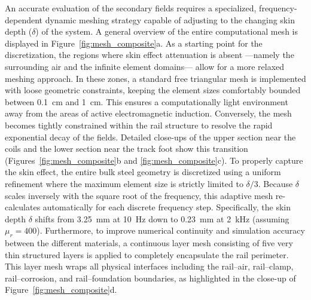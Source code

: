 An accurate evaluation of the secondary fields requires a specialized,
frequency-dependent dynamic meshing strategy capable of adjusting to the
changing skin depth ($\delta$) of the system. A general overview of the
entire computational mesh is displayed in Figure~\ref{fig:mesh_composite}a.
As a starting point for the discretization, the regions where skin effect
attenuation is absent ---namely the surrounding air and the infinite element
domains--- allow for a more relaxed meshing approach. In these zones, a
standard free triangular mesh is implemented with loose geometric
constraints, keeping the element sizes comfortably bounded between
\SI{0.1}{\centi\meter} and \SI{1}{\centi\meter}. This ensures a
computationally light environment away from the areas of active
electromagnetic induction. Conversely, the mesh becomes tightly constrained
within the rail structure to resolve the rapid exponential decay of the
fields. Detailed close-ups of the upper section near the coils and the lower
section near the track foot show this transition
(Figures~\ref{fig:mesh_composite}b and \ref{fig:mesh_composite}c). To
properly capture the skin effect, the entire bulk steel geometry is
discretized using a uniform refinement where the maximum element size is
strictly limited to $\delta/3$. Because $\delta$ scales inversely with the
square root of the frequency, this adaptive mesh re-calculates automatically
for each discrete frequency step. Specifically, the skin depth $\delta$
shifts from \SI{3.25}{\milli\meter} at \SI{10}{\hertz} down to
\SI{0.23}{\milli\meter} at \SI{2}{\kilo\hertz} (assuming $\mu_r=400$).
Furthermore, to improve numerical continuity and simulation accuracy between
the different materials, a continuous layer mesh consisting of five very thin
structured layers is applied to completely encapsulate the rail perimeter.
This layer mesh wraps all physical interfaces including the rail--air,
rail--clamp, rail--corrosion, and rail--foundation boundaries, as highlighted
in the close-up of Figure~\ref{fig:mesh_composite}d.

